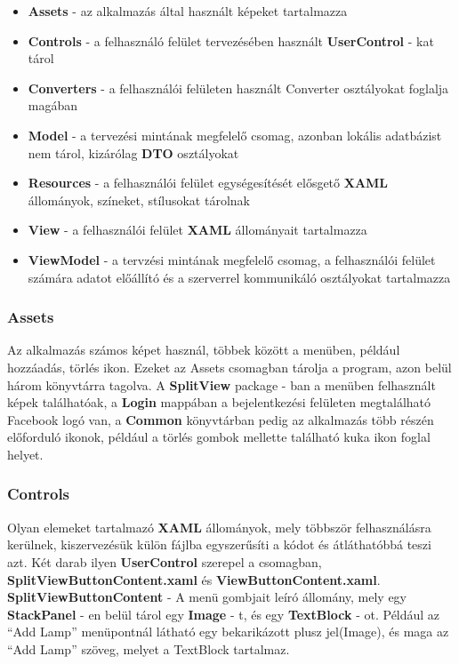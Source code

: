 \documentclass[a4paper,12pt]{report}
\begin{document}
\begin{itemize}
    \item \textbf{Assets} - az alkalmazás által használt képeket tartalmazza
    \item \textbf{Controls} - a felhasználó felület tervezésében használt \textbf{UserControl} - kat tárol
    \item \textbf{Converters} - a felhasználói felületen használt Converter osztályokat foglalja magában
    \item \textbf{Model} - a tervezési mintának megfelelő csomag, azonban lokális adatbázist nem tárol, kizárólag \textbf{DTO} osztályokat
    \item \textbf{Resources} - a felhasználói felület egységesítését elősgető \textbf{XAML} állományok, színeket, stílusokat tárolnak
    \item \textbf{View} - a felhasználói felület \textbf{XAML} állományait tartalmazza
    \item \textbf{ViewModel} - a tervzési mintának megfelelő csomag, a felhasználói felület számára adatot előállító és a szerverrel
    kommunikáló osztályokat tartalmazza
\end{itemize}

\subsubsection{Assets}
    Az alkalmazás számos képet használ, többek között a menüben, például hozzáadás, törlés ikon. Ezeket az Assets csomagban tárolja a program,
    azon belül három könyvtárra tagolva. A \textbf{SplitView} package - ban a menüben felhasznált képek találhatóak, a \textbf{Login} mappában
    a bejelentkezési felületen megtalálható Facebook logó van, a \textbf{Common} könyvtárban pedig az alkalmazás több részén előforduló ikonok,
    például a törlés gombok mellette található kuka ikon foglal helyet.

\subsubsection{Controls}
    Olyan elemeket tartalmazó \textbf{XAML} állományok, mely többször felhasználásra kerülnek, kiszervezésük külön fájlba egyszerűsíti a kódot
    és átláthatóbbá teszi azt. Két darab ilyen \textbf{UserControl} szerepel a csomagban, \textbf{SplitViewButtonContent.xaml} és
    \textbf{ViewButtonContent.xaml}.\\

    \textbf{SplitViewButtonContent} - A menü gombjait leíró állomány, mely egy \textbf{StackPanel} - en belül tárol egy \textbf{Image} - t,
    és egy \textbf{TextBlock} - ot. Például az ``Add Lamp'' menüpontnál látható egy bekarikázott plusz jel(Image), és maga az ``Add Lamp''
    szöveg, melyet a TextBlock tartalmaz.\\
\end{document}
